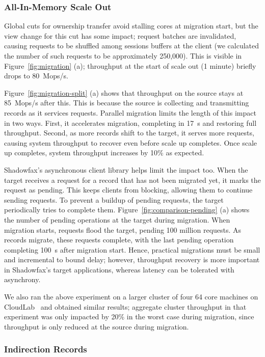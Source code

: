 \subsubsection{All-In-Memory Scale Out}

Global cuts for ownership transfer avoid stalling cores at migration start, but
the view change for this cut has some impact; request batches are invalidated,
causing requests to be shuffled among sessions buffers at the client
(we calculated the number of such requests to be approximately 250,000).
%
This is visible in Figure~\ref{fig:migration} (a); throughput at the
start of scale out (1 minute) briefly drops to 80~Mops/s.

Figure~\ref{fig:migration-split} (a) shows that throughput on the source
stays at 85~Mops/s after this.
%
This is because the source is collecting and transmitting records as it
services requests.
%
Parallel migration limits the length of this impact in two ways.
%
First, it accelerates migration, completing in 17~s and restoring full
throughput.
%
Second, as more records shift to the target, it
serves more requests, causing system throughput to recover
even before scale up completes.
%
Once scale up completes, system throughput increases by 10\% as expected.

Shadowfax's asynchronous client library helps limit the
impact too.
%
When the target receives a request for a record that has not been
migrated yet, it marks the request as pending.
%
This keeps clients from blocking, allowing them to
continue sending requests.
%
To prevent a buildup of pending requests, the target periodically tries to complete them.
%
Figure~\ref{fig:comparison-pending} (a) shows the number of pending operations at the
target during migration.
%
When migration starts, requests flood the target, pending 100 million requests.
%
As records migrate, these requests complete, with the last pending operation
completing 100~s after migration start.
%
Hence, practical migrations must be small and incremental to bound
delay; however, throughput recovery is more important in Shadowfax's target
applications, whereas latency can be tolerated with asynchrony.

We also ran the above experiment on a larger cluster of four 64 core machines
on CloudLab~\cite{cloudlab} and obtained similar results; aggregate cluster
throughput in that experiment was only impacted by 20\% in the worst case
during migration, since throughput is only reduced at the source during
migration.

\subsubsection{Indirection Records}
\label{sec:eval:migration:indir}


